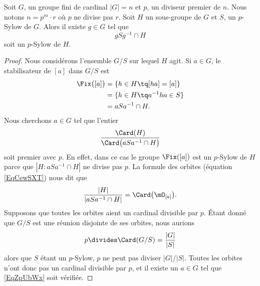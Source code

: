 \begin{lemma}       \label{LemwDYQMg}
    Soit \( G\), un groupe fini de cardinal \( | G |=n\) et \( p\), un diviseur premier de \( n\). Nous notons \( n=p^m\cdot r\) où \( p\) ne divise pas \( r\). Soit \( H\) un sous-groupe de \( G\) et \( S\), un \( p\)-Sylow de \( G\). Alors il existe \( g\in G\) tel que
    \begin{equation}
        gSg^{-1}\cap H
    \end{equation}
    soit un \( p\)-Sylow de \( H\).
\end{lemma}

\begin{proof}
    Nous considérons l'ensemble \( G/S\) sur lequel \( H\) agit. Si \( a\in G\), le stabilisateur de \( [a]\) dans \( G/S\) est
    \begin{subequations}
        \begin{align}
            \Fix\big( [a] \big)&=\{ h\in H\tq [ha]=[a] \}\\
            &=\{ h\in H\tq a^{-1}ha\in S\}\\
            &=aSa^{-1}\cap H.
        \end{align}
    \end{subequations}
    Nous cherchons \( a\in G\) tel que l'entier
    \begin{equation}        \label{EqZpUbWx}
        \frac{ \Card(H) }{ \Card\big( aSa^{-1}\cap H \big) }
    \end{equation}
    soit premier avec \( p\). En effet, dans ce cas le groupe \( \Fix([a])\) est un $p$-Sylow de \( H\) parce que \( | H:aSa^{-1}\cap H |\) ne divise pas \( p\). La formule des orbites (équation \eqref{EqCewSXT}) nous dit que
    \begin{equation}
        \frac{ | H | }{ | aSa^{-1}\cap H | }=\Card\big( \mO_{[a]} \big).
    \end{equation}
    Supposons que toutes les orbites aient un cardinal divisible par \( p\). Étant donné que \( G/S\) est une réunion disjointe de ses orbites, nous aurions
    \begin{equation}
        p\divides \Card(G/S)=\frac{ | G | }{ | S | }
    \end{equation}
    alors que \( S\) étant un $p$-Sylow, \( p\) ne peut pas diviser \( | G |/| S |\). Toutes les orbites n'ont donc pas un cardinal divisible par \( p\), et il existe un \( a\in G\) tel que \eqref{EqZpUbWx} soit vérifiée.
\end{proof}


